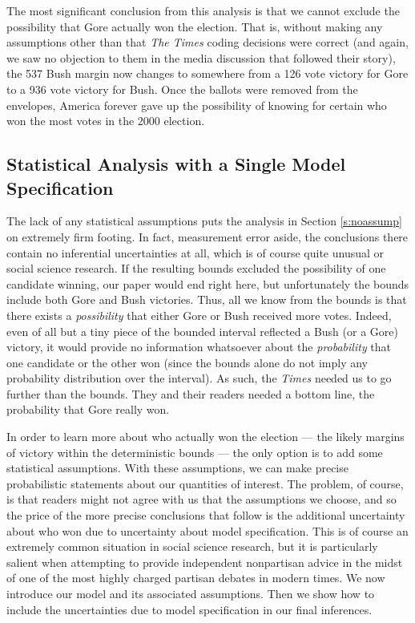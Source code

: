 \documentclass[11pt,titlepage]{article}
\begin{document}
The most significant conclusion from this analysis is that we cannot
exclude the possibility that Gore actually won the election.  That is,
without making any assumptions other than that \emph{The Times} coding
decisions were correct (and again, we saw no objection to them in the
media discussion that followed their story), the 537 Bush margin now
changes to somewhere from a 126 vote victory for Gore to a 936 vote
victory for Bush.  Once the ballots were removed from the envelopes,
America forever gave up the possibility of knowing for certain who won
the most votes in the 2000 election.

\subsection{Statistical Analysis with a Single Model Specification}
\label{s:onemodel} 

The lack of any statistical assumptions puts the analysis in Section
\ref{s:noassump} on extremely firm footing.  In fact, measurement
error aside, the conclusions there contain no inferential
uncertainties at all, which is of course quite unusual or social
science research.  If the resulting bounds excluded the possibility of
one candidate winning, our paper would end right here, but
unfortunately the bounds include both Gore and Bush victories.  Thus,
all we know from the bounds is that there exists a \emph{possibility}
that either Gore or Bush received more votes.  Indeed, even of all but
a tiny piece of the bounded interval reflected a Bush (or a Gore)
victory, it would provide no information whatsoever about the
\emph{probability} that one candidate or the other won (since the
bounds alone do not imply any probability distribution over the
interval).  As such, the \emph{Times} needed us to go further than the
bounds.  They and their readers needed a bottom line, the probability
that Gore really won.

In order to learn more about who actually won the election --- the
likely margins of victory within the deterministic bounds --- the only
option is to add some statistical assumptions.  With these
assumptions, we can make precise probabilistic statements about our
quantities of interest.  The problem, of course, is that readers might
not agree with us that the assumptions we choose, and so the price of
the more precise conclusions that follow is the additional uncertainty
about who won due to uncertainty about model specification.  This is
of course an extremely common situation in social science research,
but it is particularly salient when attempting to provide independent
nonpartisan advice in the midst of one of the most highly charged
partisan debates in modern times.  We now introduce our model and its
associated assumptions.  Then we show how to include the uncertainties
due to model specification in our final inferences.
\end{document}
